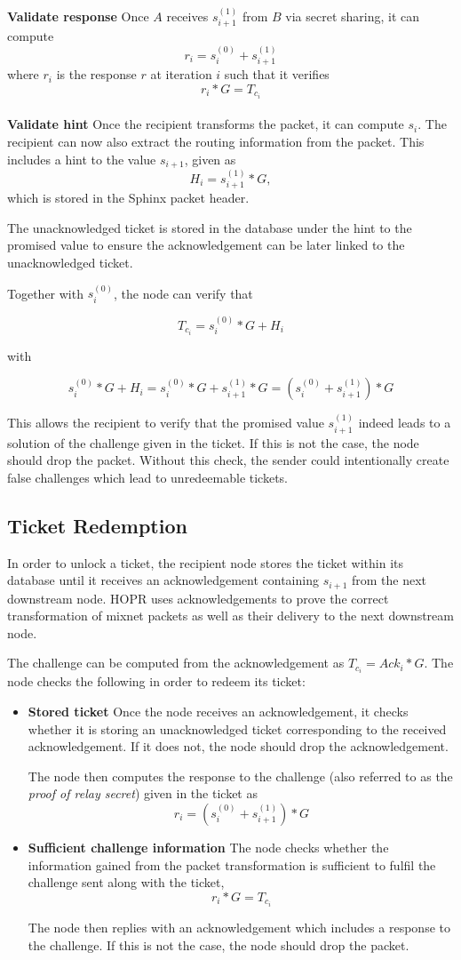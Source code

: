 \textbf{Validate response} Once $A$ receives $s_{i+1}^{(1)}$ from $B$ via secret sharing, it can compute $$r_i=s_i^{(0)}+s_{i+1}^{(1)}$$ where $r_i$ is the response $r$ at iteration $i$ such that it verifies
$$r_i*G=T_{c_i}$$
\\\textbf{Validate hint} Once the recipient transforms the packet, it can compute $s_i$. The recipient can now also extract the routing information from the packet.
This includes a hint to the value $s_{i+1}$, given as $$H_i=s_{i+1}^{(1)}*G,$$ which is stored in the Sphinx packet header.

The unacknowledged ticket is stored in the database under the hint to the promised value to ensure the acknowledgement can be later linked to the unacknowledged ticket.

Together with $s_i^{(0)}$, the node can verify that

$$T_{c_i}=s_i^{(0)}*G+H_i$$

with

$$s_i^{(0)}*G+H_i=s_i^{(0)}*G+s_{i+1}^{(1)}*G=(s_i^{(0)}+s_{i+1}^{(1)})*G$$

This allows the recipient to verify that the promised value $s_{i+1}^{(1)}$ indeed leads to a solution of the challenge given in the ticket. If this is not the case, the node should drop the packet. Without this check, the sender could intentionally create false challenges which lead to unredeemable tickets.


\subsection{Ticket Redemption}

In order to unlock a ticket, the recipient node stores the ticket within its database until it receives an acknowledgement containing $s_{i+1}$ from the next downstream node. HOPR uses acknowledgements to prove the correct transformation of mixnet packets as well as their delivery to the next downstream node.

The challenge can be computed from the acknowledgement as $T_{c_i}=Ack_i*G$. The node checks the following in order to redeem its ticket:
\begin{itemize}
    \item
          \textbf{Stored ticket} Once the node receives an acknowledgement, it checks whether it is storing an unacknowledged ticket corresponding to the received acknowledgement. If it does not, the node should drop the acknowledgement.

          The node then computes the response to the challenge (also referred to as the \textit{proof of relay secret}) given in the ticket as $$r_i=(s_i^{(0)}+s_{i+1}^{(1)})*G$$
    \item
          \textbf{Sufficient challenge information} The node checks whether the information gained from the packet transformation is sufficient to fulfil the challenge sent along with the ticket, $$r_i*G=T_{c_i}$$

          The node then replies with an acknowledgement which includes a response to the challenge. If this is not the case, the node should drop the packet.
\end{itemize}

